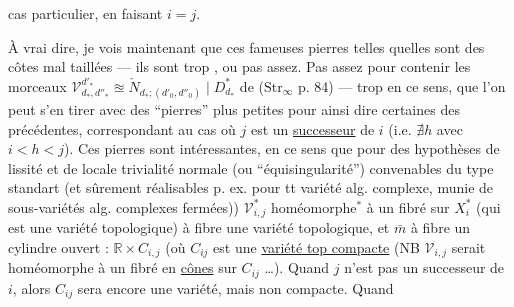 cas particulier, en faisant $i=j$.

À vrai dire, je vois maintenant que ces fameuses pierres telles quelles sont des côtes mal taillées — ils sont trop , ou pas assez. Pas assez pour contenir les morceaux $\mathcal V_{d_*,d''_*}^{d'_*}\approxeq\check N_{d_*;(d'_0,d''_0)}\mid D_{d_*}^*$ de ($\mathrm{Str}_\infty$ p. 84) — trop en ce sens, que l'on peut s'en tirer avec des ``pierres'' plus petites pour ainsi dire certaines des précédentes, correspondant au cas où $j$ est un \uline{successeur} de $i$ (i.e. $\nexists h$ avec $i<h<j$).
Ces pierres sont  intéressantes, en ce sens que pour des hypothèses de lissité et de locale trivialité normale (ou ``équisingularité'') convenables du type standart (et sûrement réalisables p. ex. pour tt variété alg. complexe, munie de sous-variétés alg. complexes fermées)) $\mathcal V_{i,j}^*$  homéomorphe$ {}^*$ à un fibré sur $X_i^*$ (qui est une variété topologique) à fibre une variété topologique, et $\bar m$ à fibre un cylindre ouvert : $\mathbb R\times C_{i,j}$  (où $C_{ij}$ est une \uline{variété top compacte} (NB $\mathcal V_{i,j}$ serait homéomorphe à un fibré en \uline{cônes} sur $C_{ij}$ \ldots). Quand $j$ n'est pas un successeur de $i$, alors $C_{ij}$ sera encore une variété, mais non compacte. Quand



